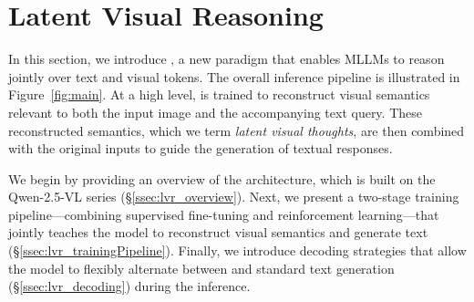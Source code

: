 \section{Latent Visual Reasoning}\label{sec:lvr}
In this section, we introduce \modelfullname, a new paradigm that enables MLLMs to reason jointly over text and visual tokens. The overall inference pipeline is illustrated in Figure~\ref{fig:main}. At a high level, \modelname is trained to reconstruct visual semantics relevant to both the input image and the accompanying text query. These reconstructed semantics, which we term \textit{latent visual thoughts}, are then combined with the original inputs to guide the generation of textual responses.


We begin by providing an overview of the \modelname architecture, which is built on the Qwen-2.5-VL series \citep{Qwen2.5-VL} (\S\ref{ssec:lvr_overview}). Next, we present a two-stage training pipeline—combining supervised fine-tuning and reinforcement learning—that jointly teaches the model to reconstruct visual semantics and generate text (\S\ref{ssec:lvr_trainingPipeline}). Finally, we introduce decoding strategies that allow the model to flexibly alternate between \modelfullname and standard text generation (\S\ref{ssec:lvr_decoding}) during the inference.



